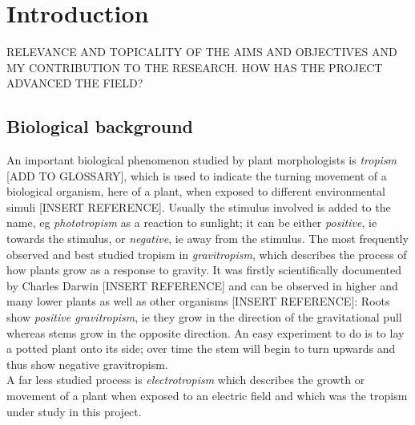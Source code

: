 
\chapter{Introduction} %

\label{introduction} %


\newcommand{\keyword}[1]{\textbf{#1}}
\newcommand{\tabhead}[1]{\textbf{#1}}
\newcommand{\code}[1]{\texttt{#1}}
\newcommand{\file}[1]{\texttt{\bfseries#1}}
\newcommand{\option}[1]{\texttt{\itshape#1}}


RELEVANCE AND TOPICALITY OF THE AIMS AND OBJECTIVES AND MY CONTRIBUTION TO THE RESEARCH.
HOW HAS THE PROJECT ADVANCED THE FIELD?


\section{Biological background}

An important biological phenomenon studied by plant morphologists is \textit{tropism} [ADD TO GLOSSARY], which is used to indicate the turning movement of a biological organism, here of a plant, when exposed to different environmental simuli [INSERT REFERENCE]. Usually the stimulus involved is added to the name, eg \textit{phototropism} as a reaction to sunlight; it can be either \textit{positive}, ie towards the stimulus, or \textit{negative}, ie away from the stimulus.
The most frequently observed and best studied tropism in \textit{gravitropism}, which describes the process of how plants grow as a response to gravity. It was firstly scientifically documented by Charles Darwin [INSERT REFERENCE] and can be observed in higher and many lower plants as well as other organisms [INSERT REFERENCE]: Roots show \textit{positive gravitropism}, ie they grow in the direction of the gravitational pull whereas stems grow in the opposite direction. An easy experiment to do is to lay a potted plant onto its side; over time the stem will begin to turn upwards and thus show negative gravitropism. \\
A far less studied process is \textit{electrotropism} which describes the growth or movement of a plant when exposed to an electric field and which was the tropism under study in this project. 

